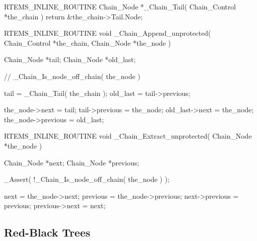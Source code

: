 \begin{nicec}
RTEMS_INLINE_ROUTINE Chain_Node *_Chain_Tail(
  Chain_Control *the_chain
)
{
  return &the_chain->Tail.Node;
}
\end{nicec}


\begin{nicec}
RTEMS_INLINE_ROUTINE void _Chain_Append_unprotected(
  Chain_Control *the_chain,
  Chain_Node    *the_node
)
{
  Chain_Node *tail;
  Chain_Node *old_last;

  // _Chain_Is_node_off_chain( the_node )

  tail = _Chain_Tail( the_chain );
  old_last = tail->previous;

  the_node->next = tail;
  tail->previous = the_node;
  old_last->next = the_node;
  the_node->previous = old_last;
}
\end{nicec}


\begin{nicec}
RTEMS_INLINE_ROUTINE void _Chain_Extract_unprotected(
  Chain_Node *the_node
)
{
  Chain_Node *next;
  Chain_Node *previous;

  _Assert( !_Chain_Is_node_off_chain( the_node ) );

  next           = the_node->next;
  previous       = the_node->previous;
  next->previous = previous;
  previous->next = next;
}
\end{nicec}

\newpage
\subsection{Red-Black Trees}

